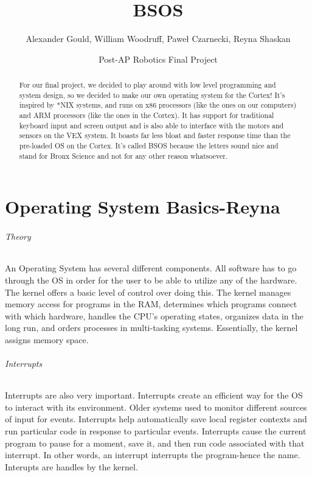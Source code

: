 \documentclass[english]{paper}
\begin{document}
\title{BSOS}


\author{Alexander Gould, William Woodruff, Pawe\l{} Czarnecki, Reyna Shaskan}


\date{Post-AP Robotics Final Project}
\maketitle
\begin{abstract}
For our final project, we decided to play around with low level programming
and system design, so we decided to make our own operating system
for the Cortex! It's inspired by {*}NIX systems, and runs on x86 processors
(like the ones on our computers) and ARM processors (like the ones
in the Cortex). It has support for traditional keyboard input and
screen output and is also able to interface with the motors and sensors
on the VEX system. It boasts far less bloat and faster response time
than the pre-loaded OS on the Cortex. It's called BSOS because the
letters sound nice and stand for Bronx Science and not for any other reason whatsoever.
\end{abstract}

\part{Operating System Basics-Reyna}
\paragraph{Theory}
An Operating System has several different components. All software has to go through the OS in order for the user to be able to utilize any of the hardware. The kernel offers a basic level of control over doing this. The kernel manages memory access for programs in the RAM, determines which programs connect with which hardware, handles the CPU's operating states, organizes data in the long run, and orders processes in multi-tasking systems. Essentially, the kernel assigns memory space.

\paragraph{Interrupts}
Interrupts are also very important. Interrupts create an efficient way for the OS to interact with its environment. Older systems used to monitor different sources of input for events. Interrupts help automatically save local register contexts and run particular code in response to particular events. Interrupts cause the current program to pause for a moment, save it, and then run code associated with that interrupt. In other words, an interrupt interrupts the program-hence the name. Interupts are handles by the kernel.
\end{document}
